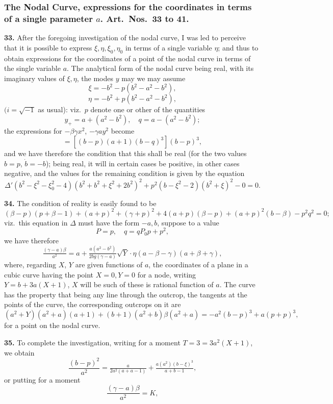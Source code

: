\documentclass[11pt,a4paper]{article}
\begin{document}
\subsubsection*{The Nodal Curve, expressions for the coordinates in terms of a single parameter $a$. Art.\ Nos.\ 33 to 41.}

\textbf{33.} After the foregoing investigation of the nodal curve, I was led to perceive that it is possible to express $\xi, \eta, \xi_0, \eta_0$ in terms of a single variable $\eta$; and thus to obtain expressions for the coordinates of a point of the nodal curve in terms of the single variable $a$. The analytical form of the nodal curve being real, with its imaginary values of $\xi, \eta$, the modes $y$ may we may assume
\[
\xi = -b^2 - p(b^2 - a^2 - b^2),
\]
\[
\eta = -b^2 + p(b^2 - a^2 - b^2),
\]
$(i = \sqrt{-1}$ as usual): viz.\ $p$ denote one or other of the quantities
\[
y_+ = a + (a^2 - b^2),\quad q = a - (a^2 - b^2);
\]
the expressions for $-\beta\gamma x^2$, $-\gamma a y^2$ become
\[
= [(b - p)(a + 1)(b - q)^3](b - p)^3,
\]
and we have therefore the condition that this shall be real (for the two values $b = p$, $\dot{b} = -b$); being real, it will in certain cases be positive, in other cases negative, and the values for the remaining condition is given by the equation
\[
\Delta'(b^2 - \xi^2 - \xi_0^2 - 4)(b^2 + b^2 + \xi^2 + 2b^2)^2 + p^2(b - \xi^2 - 2)(b^2 + \xi)^2 - 0 = 0.
\]

\textbf{34.} The condition of reality is easily found to be
\[
(\beta - p)(p + \beta - 1) + (a + p)^2 + (\gamma + p)^2 + 4(a + p)(\beta - p) + (a + p)^2(b - \beta) - p^2 q^2 = 0;
\]
viz.\ this equation in $\Delta$ must have the form $-a, b$, suppose to a value
\[
P = p, \quad q = qP_0p + p^2,
\]
we have therefore
\[
\tfrac{(\gamma - a)\beta}{a^2} = a + \tfrac{a(a^2 - b^2)}{2bg(\gamma - a)}\sqrt{Y}\cdot\eta(a - \beta - \gamma)(a + \beta + \gamma),
\]
where, regarding $X$, $Y$ are given functions of $a$, the coordinates of a plane in a cubic curve having the point $X = 0, Y = 0$ for a node, writing $Y = b + 3a(X + 1)$, $X$ will be such of these is rational function of $a$. The curve has the property that being any line through the outcrop, the tangents at the points of the curve, the corresponding outcrops on it are
\[
(a^2 + Y)(a^2 + a)(a + 1) + (b + 1)(a^2 + b)\beta(a^2 + a) = -a^2(b - p)^3 + a(p + p)^3,
\]
for a point on the nodal curve.

\textbf{35.} To complete the investigation, writing for a moment $T = 3 = 3a^2(X + 1)$, we obtain
\[
\frac{(b - p)^2}{a^2} = \tfrac{a}{2a^2(a + a - 1)} + \tfrac{a(a^2)(b - \xi)^3}{a + b - 1},
\]
or putting for a moment
\[
\frac{(\gamma - a)\beta}{a^2} = K,
\]
\end{document}

